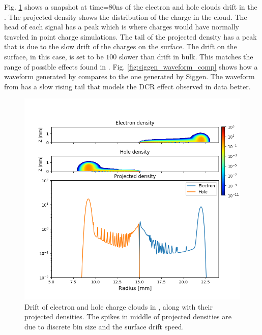 Fig. \ref{fig:ehd_path_pd} shows a snapshot at time=$80$ns of the electron and hole clouds drift in the {\tdsim}. The projected density shows the distribution of the charge in the cloud. The head of each signal has a peak which is where charges would have normally traveled in point charge simulations. The tail of the projected density has a peak that is due to the slow drift of the charges on the surface. The drift on the surface, in this case, is set to be $100$ slower than drift in bulk. This matches the range of possible effects found in \cite{MULLOWNEY201233}. Fig. \ref{fig:siggen_waveform_comp} shows how a waveform generated by {\tdsim} compares to the one generated by Siggen. The waveform from {\tdsim} has a slow rising tail that models the DCR effect observed in data better.

\begin{figure}
\centering
\includegraphics[width=0.7\linewidth]{ch3/figs/ehd_path.png}
\caption{Drift of electron and hole charge clouds in {\tdsim}, along with their projected densities. The spikes in middle of projected densities are due to discrete bin size and the surface drift speed.}
\label{fig:ehd_path_pd}
\end{figure}

